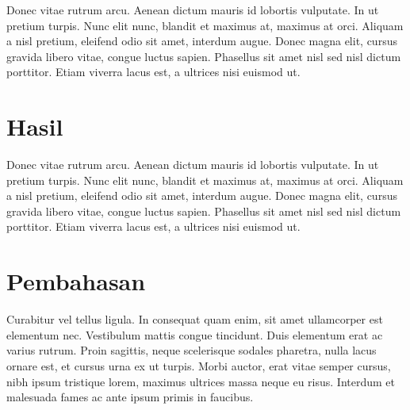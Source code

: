 

Donec vitae rutrum arcu. Aenean dictum mauris id lobortis
vulputate. In ut pretium turpis. Nunc elit nunc, blandit et maximus
at, maximus at orci. Aliquam a nisl pretium, eleifend odio sit amet,
interdum augue. Donec magna elit, cursus gravida libero vitae, congue
luctus sapien. Phasellus sit amet nisl sed nisl dictum
porttitor. Etiam viverra lacus est, a ultrices nisi euismod ut.


\section{Hasil}

Donec vitae rutrum arcu. Aenean dictum mauris id lobortis
vulputate. In ut pretium turpis. Nunc elit nunc, blandit et maximus
at, maximus at orci. Aliquam a nisl pretium, eleifend odio sit amet,
interdum augue. Donec magna elit, cursus gravida libero vitae, congue
luctus sapien. Phasellus sit amet nisl sed nisl dictum
porttitor. Etiam viverra lacus est, a ultrices nisi euismod ut.


\section{Pembahasan}

Curabitur vel tellus ligula. In consequat quam enim, sit amet
ullamcorper est elementum nec. Vestibulum mattis congue
tincidunt. Duis elementum erat ac varius rutrum. Proin sagittis, neque
scelerisque sodales pharetra, nulla lacus ornare est, et cursus urna
ex ut turpis. Morbi auctor, erat vitae semper cursus, nibh ipsum
tristique lorem, maximus ultrices massa neque eu risus. Interdum et
malesuada fames ac ante ipsum primis in faucibus.

